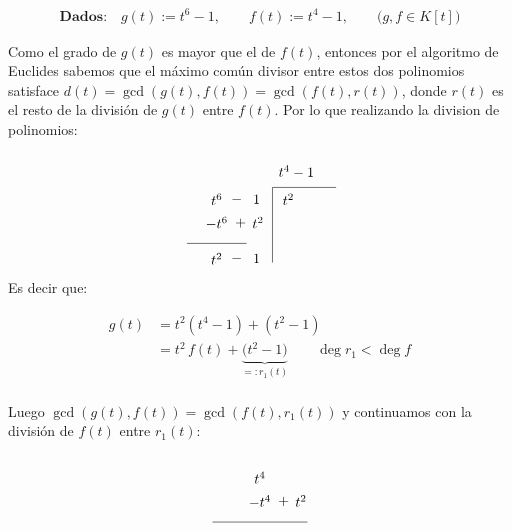 \begin{solution}
    \begin{equation*}
    \begin{aligned}
        \textbf{Dados:}\quad 
            g(t):=t^{6}-1, \qquad
            f(t):=t^{4}-1, \qquad
            \bigl(g,f\in K[t]\bigr)
    \end{aligned}
    \end{equation*}
        
        Como el grado de $g(t)$ es mayor que el de $f(t)$, entonces por el algoritmo de Euclides sabemos que el máximo común divisor entre estos dos polinomios satisface $d(t)= \gcd(g(t),f(t)) = \gcd(f(t),r(t))$, donde $r(t)$ es el resto de la división de $g(t)$ entre $f(t)$. Por lo que realizando la division de polinomios:
      \[
      \begin{tikzpicture}[baseline={(current bounding box.north)}]
        \node at (0,0.3) {$t^6$};
        \node at (0,-0.3) {$-t^6$};
        \node at (0,-.8) {$\underline{\hspace{1.5cm}}$};
        \node at (.6,-.3) {$+$};
        \node at (.9,-.3) {$\phantom{-}t^2$};

        \node at (.5,0.3) {$-$};
        \node at (1,0.3) {$1$};
        \draw (1.4,0.6) -- (3,0.6);
        \draw (1.4,0.6) -- (1.4,-1.3);
        \node at (2,1.0) {$t^4 - 1$};
        \node at (1.8,0.3) {$t^2$};
        \node at (0,-1.2) {$t^2$};
        \node at (0.5,-1.2) {$-$};
        \node at (1,-1.2) {$1$};
      \end{tikzpicture}
      \]
        Es decir que:

        \[
        \begin{aligned}
        g(t)&= t^2 (t^4-1) + (t^2-1)\\
            &= t^{2}\,f(t)+\underbrace{\bigl(t^{2}-1\bigr)}_{=:r_{1}(t)} \qquad \deg r_{1}<\deg f\\
        \end{aligned}
        \]

        Luego $\gcd(g(t),f(t))=\gcd(f(t),r_{1}(t))$ y continuamos con la división de $f(t)$ entre $r_{1}(t)$:

        \[
          \begin{tikzpicture}[baseline={(current bounding box.north)}]
            \node at (0,0.3) {$t^4$};
            \node at (0,-0.3) {$-t^4$};
            \node at (0,-.8) {$\underline{\hspace{2.4cm}}$};
            \node at (.6,-.3) {$+$};
            \node at (.9,-.3) {$\phantom{-}t^2$};
    

\end{tikzpicture}\]
\end{solution}
